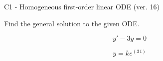 \begin{exercise}
  \begin{exerciseTitle}C1 - Homogeneous first-order linear ODE (ver. 16)\end{exerciseTitle}
  \begin{exerciseStatement}
    
Find the general solution to the given ODE.

    
\[y'-3y=0\]

  \end{exerciseStatement}
  \begin{exerciseAnswer}
    
\[y= k e^{\left(3 \, t\right)}\]

  \end{exerciseAnswer}
\end{exercise}
